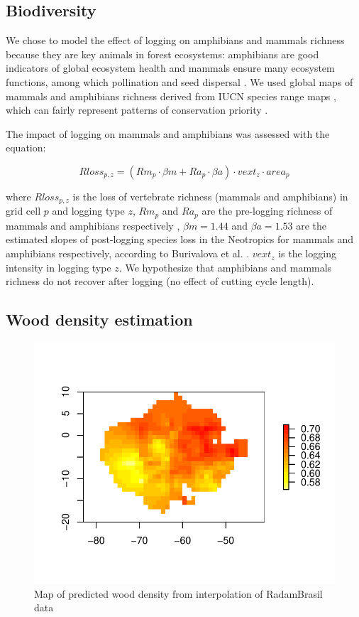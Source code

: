 \documentclass{article}
\begin{document}
\subsection{Biodiversity}

We chose to model the effect of logging on amphibians and mammals richness because they are key animals in forest ecosystems: amphibians are good indicators of global ecosystem health \cite{Welsh1998,Collins2003} and mammals ensure many ecosystem functions, among which pollination \cite{Fleming2009} and seed dispersal \cite{Wright2000,Muscarella2007}. We used global maps of mammals and amphibians richness derived from IUCN species range maps \cite{Jenkins2013,MapBiodiv}, which can fairly represent patterns of conservation priority \cite{Marechaux2017}.

The impact of logging on mammals and amphibians was assessed with the equation: 

\begin{equation}
\label{eq:rloss}
Rloss_{p,z} = \left(Rm_{p} \cdot \beta m + Ra_{p} \cdot \beta a  \right)  \cdot vext_z \cdot area_p 
\end{equation}

where $Rloss_{p,z}$ is the loss of vertebrate richness (mammals and amphibians) in grid cell $p$ and logging type $z$, $Rm_{p}$ and $Ra_p$ are the pre-logging richness of mammals and amphibians respectively \cite{Jenkins2013}, $\beta m = 1.44$ and $\beta a = 1.53$  are the estimated slopes of post-logging species loss in the Neotropics for mammals and amphibians respectively, according to Burivalova et al. \cite{Burivalova2014}. $vext_z$ is the logging intensity in logging type $z$.
We hypothesize that amphibians and mammals richness do not recover after logging (no effect of cutting cycle length). 

\subsection{Wood density estimation}
\label{supmat:wdext}

\begin{figure}
    \centering
    \includegraphics[width=0.7\linewidth]{graphs/map_WDext.pdf}
    \caption{Map of predicted wood density from interpolation of RadamBrasil data}
    \label{sfig:wdext}
\end{figure}
\end{document}
